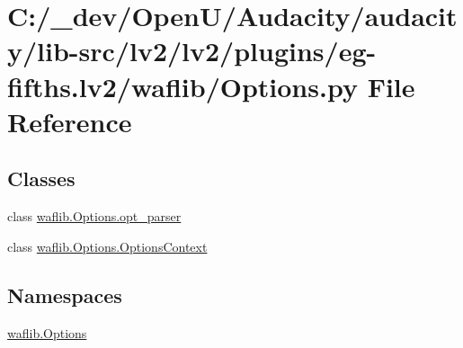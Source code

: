 \hypertarget{lv2_2plugins_2eg-fifths_8lv2_2waflib_2_options_8py}{}\section{C\+:/\+\_\+dev/\+Open\+U/\+Audacity/audacity/lib-\/src/lv2/lv2/plugins/eg-\/fifths.lv2/waflib/\+Options.py File Reference}
\label{lv2_2plugins_2eg-fifths_8lv2_2waflib_2_options_8py}
\subsection*{Classes}
\begin{DoxyCompactItemize}
\item 
class \hyperlink{classwaflib_1_1_options_1_1opt__parser}{waflib.\+Options.\+opt\+\_\+parser}
\item 
class \hyperlink{classwaflib_1_1_options_1_1_options_context}{waflib.\+Options.\+Options\+Context}
\end{DoxyCompactItemize}
\subsection*{Namespaces}
\begin{DoxyCompactItemize}
\item 
 \hyperlink{namespacewaflib_1_1_options}{waflib.\+Options}
\end{DoxyCompactItemize}
